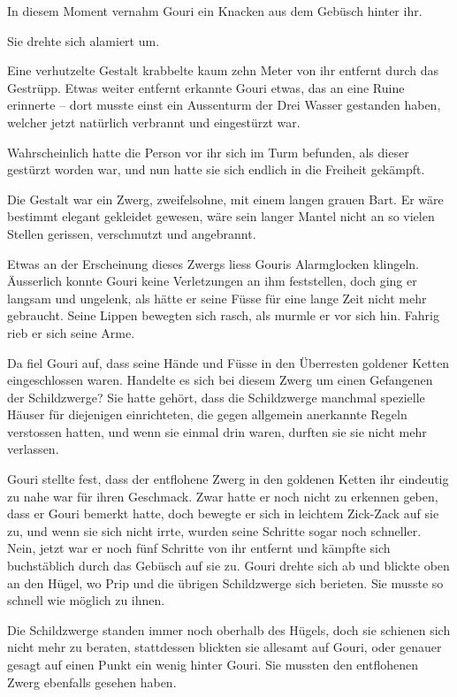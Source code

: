 \documentclass[10pt, a4paper, oneside]{book}
\begin{document}
In diesem Moment vernahm Gouri ein Knacken aus dem Gebüsch hinter ihr.

Sie drehte sich alamiert um.

Eine verhutzelte Gestalt krabbelte kaum zehn Meter von ihr entfernt durch das Gestrüpp. Etwas weiter entfernt erkannte Gouri etwas, das an eine Ruine erinnerte – dort musste einst ein Aussenturm der Drei Wasser gestanden haben, welcher jetzt natürlich verbrannt und eingestürzt war.

Wahrscheinlich hatte die Person vor ihr sich im Turm befunden, als dieser gestürzt worden war, und nun hatte sie sich endlich in die Freiheit gekämpft.

Die Gestalt war ein Zwerg, zweifelsohne, mit einem langen grauen Bart. Er wäre bestimmt elegant gekleidet gewesen, wäre sein langer Mantel nicht an so vielen Stellen gerissen, verschmutzt und angebrannt.

Etwas an der Erscheinung dieses Zwergs liess Gouris Alarmglocken klingeln. Äusserlich konnte Gouri keine Verletzungen an ihm feststellen, doch ging er langsam und ungelenk, als hätte er seine Füsse für eine lange Zeit nicht mehr gebraucht. Seine Lippen bewegten sich rasch, als murmle er vor sich hin. Fahrig rieb er sich seine Arme.

Da fiel Gouri auf, dass seine Hände und Füsse in den Überresten goldener Ketten eingeschlossen waren. Handelte es sich bei diesem Zwerg um einen Gefangenen der Schildzwerge? Sie hatte gehört, dass die Schildzwerge manchmal spezielle Häuser für diejenigen einrichteten, die gegen allgemein anerkannte Regeln verstossen hatten, und wenn sie einmal drin waren, durften sie sie nicht mehr verlassen.

Gouri stellte fest, dass der entflohene Zwerg in den goldenen Ketten ihr eindeutig zu nahe war für ihren Geschmack. Zwar hatte er noch nicht zu erkennen geben, dass er Gouri bemerkt hatte, doch bewegte er sich in leichtem Zick-Zack auf sie zu, und wenn sie sich nicht irrte, wurden seine Schritte sogar noch schneller. Nein, jetzt war er noch fünf Schritte von ihr entfernt und kämpfte sich buchstäblich durch das Gebüsch auf sie zu. Gouri drehte sich ab und blickte oben an den Hügel, wo Prip und die übrigen Schildzwerge sich berieten. Sie musste so schnell wie möglich zu ihnen.

Die Schildzwerge standen immer noch oberhalb des Hügels, doch sie schienen sich nicht mehr zu beraten, stattdessen blickten sie allesamt auf Gouri, oder genauer gesagt auf einen Punkt ein wenig hinter Gouri. Sie mussten den entflohenen Zwerg ebenfalls gesehen haben.
\end{document}
